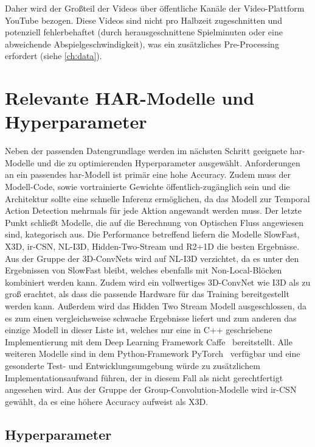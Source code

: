 Daher wird der Großteil der Videos über öffentliche Kanäle der Video-Plattform YouTube bezogen.
Diese Videos sind nicht pro Halbzeit zugeschnitten und potenziell fehlerbehaftet (\zB durch herausgeschnittene Spielminuten oder eine abweichende Abspielgeschwindigkeit), was ein zusätzliches Pre-Processing erfordert (siehe \autoref{ch:data}).

\section{Relevante HAR-Modelle und Hyperparameter}
\label{sec:decisions}

Neben der passenden Datengrundlage werden im nächsten Schritt geeignete \gls{har}-Modelle und die zu optimierenden Hyperparameter ausgewählt.
Anforderungen an ein passendes \gls{har}-Modell ist primär eine hohe Accuracy.
Zudem muss der Modell-Code, sowie vortrainierte Gewichte öffentlich-zugänglich sein und die Architektur sollte eine schnelle Inferenz ermöglichen, da das Modell zur Temporal Action Detection mehrmals für jede Aktion angewandt werden muss.
Der letzte Punkt schließt Modelle, die auf die Berechnung von Optischen Fluss angewiesen sind, kategorisch aus.
Die Performance betreffend liefern die Modelle SlowFast, X3D, ir-CSN, NL-I3D, Hidden-Two-Stream und R2+1D die besten Ergebnisse.
Aus der Gruppe der 3D-ConvNets wird auf NL-I3D verzichtet, da es unter den Ergebnissen von SlowFast bleibt, welches ebenfalls mit Non-Local-Blöcken kombiniert werden kann.
Zudem wird ein vollwertiges 3D-ConvNet wie I3D als zu groß erachtet, als dass die passende Hardware für das Training bereitgestellt werden kann.
Außerdem wird das Hidden Two Stream Modell ausgeschlossen, da es zum einen vergleichsweise schwache Ergebnisse liefert und zum anderen das einzige Modell in dieser Liste ist, welches nur eine in C++ geschriebene Implementierung mit dem Deep Learning Framework Caffe~\cite{Jia14} bereitstellt.
Alle weiteren Modelle sind in dem Python-Framework PyTorch~\cite{Paszke19} verfügbar und eine gesonderte Test- und Entwicklungsumgebung würde zu zusätzlichem Implementationsaufwand führen, der in diesem Fall als nicht gerechtfertigt angesehen wird.
Aus der Gruppe der Group-Convolution-Modelle wird ir-CSN gewählt, da es eine höhere Accuracy aufweist als X3D.

\subsection{Hyperparameter}
\label{subsec:hyperparameter}

